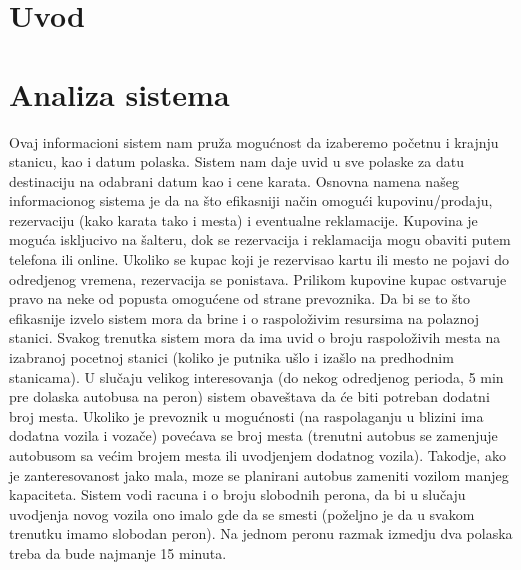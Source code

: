 \section{Uvod}

\section {Analiza sistema}

Ovaj informacioni sistem nam pru\v za mogu\'cnost da izaberemo po\v cetnu i krajnju stanicu, kao i datum polaska. Sistem nam daje uvid u sve polaske za datu destinaciju na odabrani datum kao i cene karata. 
Osnovna namena na\v seg informacionog sistema je da na \v sto efikasniji na\v cin omogu\'ci kupovinu/prodaju, rezervaciju (kako karata tako i mesta) i eventualne reklamacije. Kupovina je mogu\'ca iskljucivo na \v salteru, dok se rezervacija i reklamacija mogu obaviti putem telefona ili online. Ukoliko se kupac koji je rezervisao kartu ili mesto ne pojavi do odredjenog vremena, rezervacija se ponistava. Prilikom kupovine kupac ostvaruje pravo na neke od popusta omogu\'cene od strane prevoznika. Da bi se to \v sto efikasnije izvelo sistem mora da brine i o raspolo\v zivim resursima na polaznoj stanici. Svakog trenutka sistem mora da ima uvid o broju raspolo\v zivih mesta na izabranoj pocetnoj stanici (koliko je putnika u\v slo i iza\v slo na predhodnim stanicama). U slu\v caju velikog interesovanja (do nekog odredjenog perioda, 5 min pre dolaska autobusa na peron) sistem obave\v stava da \'ce biti potreban dodatni broj mesta. Ukoliko je prevoznik u mogu\'cnosti (na raspolaganju u blizini ima dodatna vozila i voza\v ce) pove\'cava se broj mesta (trenutni autobus se zamenjuje autobusom sa ve\'cim brojem mesta ili uvodjenjem dodatnog vozila). Takodje, ako je zanteresovanost jako mala, moze se planirani autobus zameniti vozilom manjeg kapaciteta. Sistem vodi racuna i o broju slobodnih perona, da bi u slu\v caju uvodjenja novog vozila ono imalo gde da se smesti (po\v zeljno je da u svakom trenutku imamo slobodan peron). Na jednom peronu razmak izmedju dva polaska treba da bude najmanje 15 minuta. 
